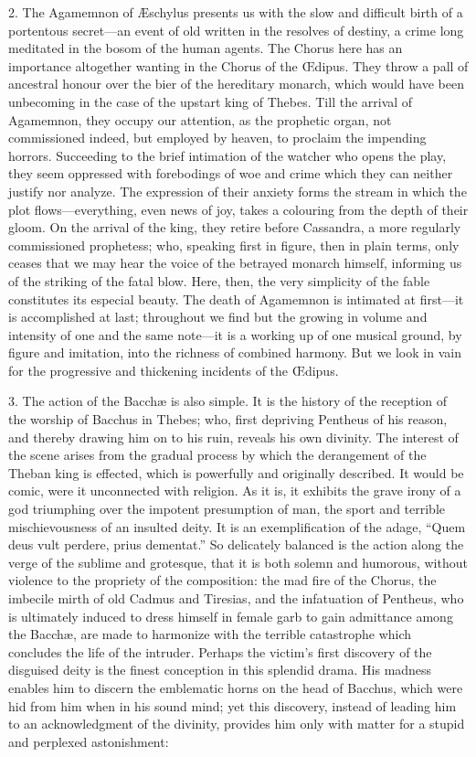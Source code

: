 2. The Agamemnon of Æschylus presents us with the slow and
difficult birth of a portentous secret—an event of old written in
the resolves of destiny, a crime long meditated in the bosom of the
human agents. The Chorus here has an importance altogether wanting in
the Chorus of the Œdipus. They throw a pall of ancestral honour over
the bier of the hereditary monarch, which would have been unbecoming
in the case of the upstart king of Thebes. Till the arrival of
Agamemnon, they occupy our attention, as the prophetic organ, not
commissioned indeed, but employed by heaven, to proclaim the impending
horrors. Succeeding to the brief intimation of the watcher who opens
the play, they seem oppressed with forebodings of woe and crime which
they can neither justify nor analyze. The expression of their
anxiety forms the stream in which the plot flows—everything, even
news of joy, takes a colouring from the depth of their gloom. On the
arrival of the king, they retire before Cassandra, a more regularly
commissioned prophetess; who, speaking first in figure, then in plain
terms, only ceases that we may hear the voice of the betrayed monarch
himself, informing us of the striking of the fatal blow. Here, then,
the very simplicity of the fable constitutes its especial beauty. The
death of Agamemnon is intimated at first—it is accomplished at last;
throughout we find but the growing in volume and intensity of one and
the same note—it is a working up of one musical ground, by figure
and imitation, into the richness of combined harmony. But we look in
vain for the progressive and thickening incidents of the Œdipus.

3. The action of the Bacchæ is also simple. It is the history of
the reception of the worship of Bacchus in Thebes; who, first
depriving Pentheus of his reason, and thereby drawing him on to his
ruin, reveals his own divinity. The interest of the scene arises from
the gradual process by which the derangement of the Theban king is
effected, which is powerfully and originally described. It would be
comic, were it unconnected with religion. As it is, it exhibits the
grave irony of a god triumphing over the impotent presumption of man,
the sport and terrible mischievousness of an insulted deity. It is an
exemplification of the adage, ``Quem deus vult perdere, prius
dementat.'' So delicately balanced is the action along the verge
of the sublime and grotesque, that it is both solemn and humorous,
without violence to the propriety of the composition: the mad fire of
the Chorus, the imbecile mirth of old Cadmus and Tiresias, and the
infatuation of Pentheus, who is ultimately induced to dress himself in
female garb to gain admittance among the Bacchæ, are made to
harmonize with the terrible catastrophe which concludes the life of
the intruder. Perhaps the victim's first discovery of the disguised
deity is the finest conception in this splendid drama. His madness
enables him to discern the emblematic horns on the head of Bacchus,
which were hid from him when in his sound mind; yet this discovery,
instead of leading him to an acknowledgment of the divinity, provides
him only with matter for a stupid and perplexed astonishment:

